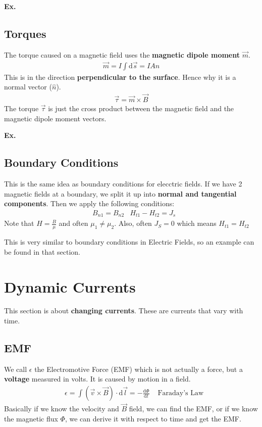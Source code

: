 \documentclass[12pt,letterpaper]{article} \usepackage{amsmath} \usepackage{graphicx} \usepackage[margin=1in]{geometry} \usepackage{longtable}  \usepackage{amssymb}
\begin{document}
	\begin{mdframed}
		\textbf{Ex. }
	\end{mdframed}
	
	\subsection{Torques}
	The torque caused on a magnetic field uses the \textbf{magnetic dipole moment} $\vec m$.
	\begin{align*}
		\vec m = I\int \mathrm d \vec s = IA\hat n
	\end{align*}
	This is in the direction \textbf{perpendicular to the surface}. Hence why it is a normal vector ($\hat n$).
	\begin{align*}
		\vec \tau = \vec m \times \vec B
	\end{align*}
	The torque $\vec \tau$ is just the cross product between the magnetic field and the magnetic dipole moment vectors.
	
	\begin{mdframed}
		\textbf{Ex. }
	\end{mdframed}
	
	\subsection{Boundary Conditions}
	This is the same idea as boundary conditions for elecctric fields. If we have 2 magnetic fields at a boundary, we split it up into \textbf{normal and tangential components}. Then we apply the following conditions:
	\begin{align*}
		&B_{n1} = B_{n2} &H_{t1} - H_{t2} = J_s
	\end{align*}
	Note that $H = \frac{B}{\mu}$ and often $\mu_1 \ne \mu_2$. Also, often $J_S=0$ which means $H_{t1} = H_{t2}$
	
	\begin{mdframed}
		This is very similar to boundary conditions in Electric Fields, so an example can be found in that section.
	\end{mdframed}
	
	\section{Dynamic Currents}
	This section is about \textbf{changing currents}. These are currents that vary with time. 
	
	\subsection{EMF}
	We call $\epsilon$ the Electromotive Force (EMF) which is not actually a force, but a \textbf{voltage} measured in volts. It is caused by motion in a field. 
	\begin{align*}
		&\epsilon = \int(\vec v \times \vec B)\cdot \mathrm d \vec l = -\frac{\mathrm d \Phi}{\mathrm d t} &\text{ Faraday's Law}
	\end{align*}
	Basically if we know the velocity and $\vec B$ field, we can find the EMF, or if we know the magnetic flux $\Phi$, we can derive it with respect to time and get the EMF. 
	
\end{document}
